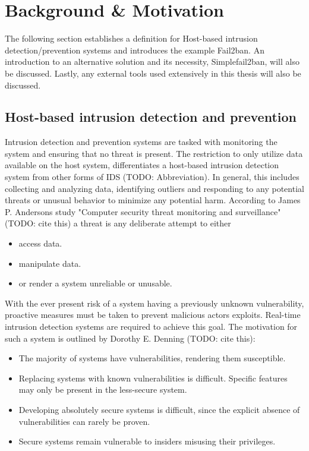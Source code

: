 %
%

\chapter{Background \& Motivation}
\label{cha:background}
The following section establishes a definition for Host-based intrusion detection/prevention systems and introduces the example Fail2ban.
An introduction to an alternative solution and its necessity, Simplefail2ban, will also be discussed.
Lastly, any external tools used extensively in this thesis will also be discussed. 

\section{Host-based intrusion detection and prevention}
Intrusion detection and prevention systems are tasked with monitoring the system and ensuring that no threat is present.
The restriction to only utilize data available on the host system, differentiates a host-based intrusion detection system from other forms of IDS (TODO: Abbreviation).
In general, this includes collecting and analyzing data, identifying outliers and responding to any potential threats or unusual behavior to minimize any potential harm.
According to James P. Andersons study "Computer security threat monitoring and surveillance"(TODO: cite this) a threat is any deliberate attempt to either
\begin{itemize}
    \itemsep0em
    \item access data.
    \item manipulate data.
    \item or render a system unreliable or unusable.
\end{itemize}

With the ever present risk of a system having a previously unknown vulnerability, proactive measures must be taken to prevent malicious actors exploits.
Real-time intrusion detection systems are required to achieve this goal.
The motivation for such a system is outlined by Dorothy E. Denning (TODO: cite this):
\begin{itemize}
    \itemsep0em
    \item The majority of systems have vulnerabilities, rendering them susceptible. 
    \item Replacing systems with known vulnerabilities is difficult. Specific features may only be present in the less-secure system.
    \item Developing absolutely secure systems is difficult, since the explicit absence of vulnerabilities can rarely be proven.
    \item Secure systems remain vulnerable to insiders misusing their privileges.
\end{itemize}

